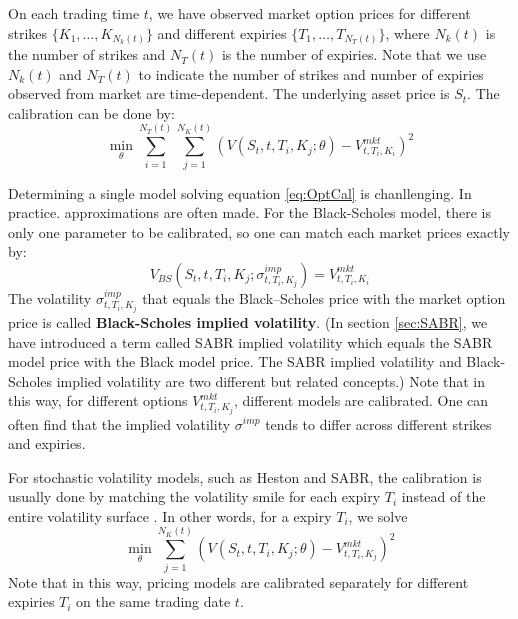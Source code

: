 \documentclass[letterpaper,12pt,titlepage,oneside,final]{book}
\numberwithin{equation}{section}
\theoremstyle{definition}
\newcommand{\Vmkt}{V^{mkt}}
\begin{document}
On each trading time $t$, we have observed market option prices for different strikes $\{K_1,\dots, K_{N_k(t)}\}$ and different expiries $\{T_1,\dots, T_{N_T(t)}\}$, where $N_k(t)$ is the number of strikes and $N_T(t)$ is the number of expiries.
Note that we use  $N_k(t)$ and $N_T(t)$ to indicate the number of strikes and number of expiries observed from market are time-dependent.
The underlying asset price is $S_t$. The calibration can be done by:
\begin{equation}
\min_{\theta}   \sum_{i=1}^{N_T(t)}  \sum_{j=1}^{N_K(t)} \left(V(S_t,t,T_i,K_j;\theta)-\Vmkt_{t,T_i,K_i}\right)^2 
\label{eq:OptCal}
\end{equation}

Determining a single model solving equation \eqref{eq:OptCal} is chanllenging. In practice. approximations are often made.
For the Black-Scholes model, there is only one parameter to be calibrated,
so  one can match each market prices exactly by:
\[
V_{BS}(S_t,t,T_i,K_j;\sigma^{imp}_{t,T_i,K_j})=\Vmkt_{t,T_i,K_i}
\]
The volatility $\sigma^{imp}_{t,T_i,K_j}$ that equals the Black–Scholes price with the market option price is called \textbf{Black-Scholes implied volatility}. (In section \ref{sec:SABR}, we have introduced a term called SABR implied volatility which equals the SABR model price with the Black model price. The SABR implied volatility and  Black-Scholes implied volatility are two different but related concepts.)
Note that in this way, for different options $\Vmkt_{t,T_i,K_j}$, different models are calibrated.  One can often find that the implied volatility $\sigma^{imp}$ tends to differ across different strikes and expiries.

For stochastic volatility models, such as Heston and SABR, the calibration is usually done by matching the volatility smile for each expiry $T_i$ instead of the entire volatility surface \cite{heston1993closed,hagan2002managing,hulloptimal}. In other words, for a  expiry $T_i$, we solve
\[
\min_{\theta} \sum_{j=1}^{N_K(t)} \left(V(S_t,t,T_i,K_j;\theta)-\Vmkt_{t,T_i,K_j}\right)^2
\]
Note that in this way, pricing models are calibrated separately for different expiries $T_i$  on the same trading date $t$.
\end{document}
